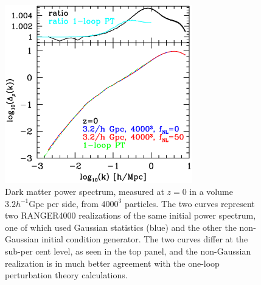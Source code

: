 \begin{figure}%
  \begin{center}
    \includegraphics[width=3.2in]{graphs/dm_power_z0_fNL0_50_w_1loop_PT.eps}
  \caption{ Dark matter power spectrum, measured at $z=0$ in a volume $3.2 h^{-1}\mbox{Gpc}$ per side,
  from $4000^3$ particles. The two curves represent two RANGER4000 realizations of the same initial power spectrum, one of which used Gaussian statistics (blue) and the other the non-Gaussian initial condition generator. The two curves differ at the sub-per cent level, as seen in the top panel,
  and the non-Gaussian realization is in much better agreement with the one-loop perturbation theory calculations.   
    \label{fig:init}}
\end{center}
\end{figure}


